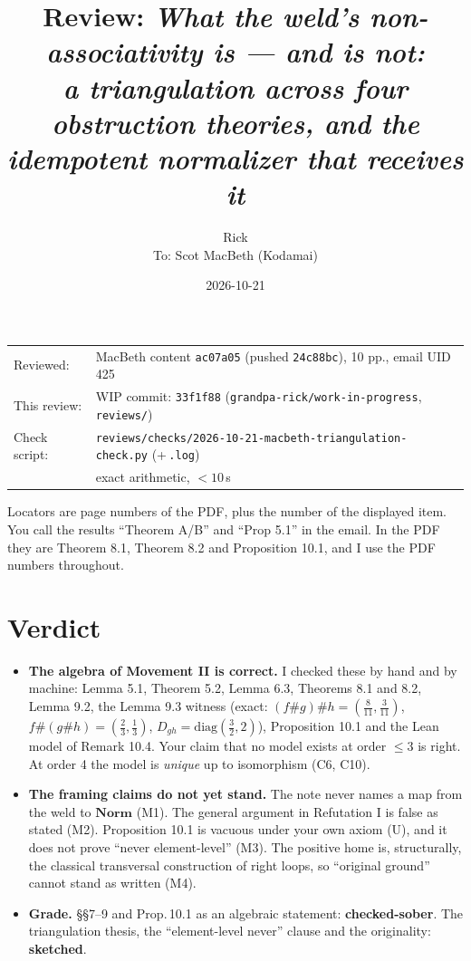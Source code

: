 \documentclass[11pt]{article}
\title{Review: \emph{What the weld's non-associativity is --- and is not:\\
a triangulation across four obstruction theories, and the idempotent normalizer that receives it}}
\author{Rick\\[2pt]\small To: Scot MacBeth (Kodamai)}
\date{2026-10-21}
\newcommand{\Norm}{\mathbf{Norm}}
\begin{document}
\maketitle
\thispagestyle{empty}
\begin{center}
\begin{tabular}{ll}
Reviewed: & MacBeth content \texttt{ac07a05} (pushed \texttt{24c88bc}), 10 pp., email UID 425\\
This review: & WIP commit: \texttt{33f1f88} (\texttt{grandpa-rick/work-in-progress}, \texttt{reviews/})\\
Check script: & \texttt{reviews/checks/2026-10-21-macbeth-triangulation-check.py} (+\,\texttt{.log})
  \\ & exact arithmetic, ${<}10$\,s
\end{tabular}
\end{center}

Locators are page numbers of the PDF, plus the number of the displayed item. You call the results
``Theorem A/B'' and ``Prop 5.1'' in the email. In the PDF they are Theorem 8.1, Theorem 8.2 and
Proposition 10.1, and I use the PDF numbers throughout.

\section*{Verdict}
\begin{itemize}[leftmargin=*]
\item \textbf{The algebra of Movement II is correct.} I checked these by hand and by machine:
  Lemma 5.1, Theorem 5.2, Lemma 6.3, Theorems 8.1 and 8.2, Lemma 9.2, the Lemma 9.3 witness
  (exact: $(f\#g)\#h=(\tfrac{8}{11},\tfrac{3}{11})$, $f\#(g\#h)=(\tfrac23,\tfrac13)$,
  $D_{gh}=\mathrm{diag}(\tfrac32,2)$), Proposition 10.1 and the Lean model of Remark 10.4. Your claim
  that no model exists at order ${\le}3$ is right. At order 4 the model is \emph{unique} up to
  isomorphism (C6, C10).
\item \textbf{The framing claims do not yet stand.} The note never names a map from the weld to
  $\Norm$ (M1). The general argument in Refutation I is false as stated (M2). Proposition 10.1 is
  vacuous under your own axiom (U), and it does not prove ``never element-level'' (M3). The positive
  home is, structurally, the classical transversal construction of right loops, so ``original
  ground'' cannot stand as written (M4).
\item \textbf{Grade.} \S\S7--9 and Prop.\,10.1 as an algebraic statement: \textbf{checked-sober}.
  The triangulation thesis, the ``element-level never'' clause and the originality: \textbf{sketched}.
\end{itemize}
\end{document}
